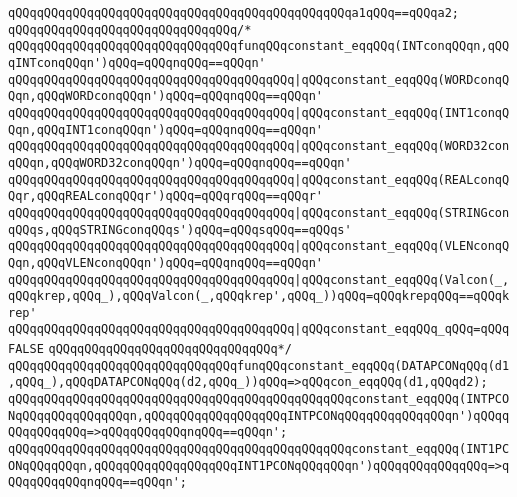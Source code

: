 \verb|qQQqqQQqqQQqqQQqqQQqqQQqqQQqqQQqqQQqqQQqqQQqqQQqa1qQQq==qQQqa2;|\newline
\newline
\verb|qQQqqQQqqQQqqQQqqQQqqQQqqQQqqQQq/*|\newline
\verb|qQQqqQQqqQQqqQQqqQQqqQQqqQQqqQQqfunqQQqconstant_eqqQQq(INTconqQQqn,qQQqINTconqQQqn')qQQq=qQQqnqQQq==qQQqn'|\newline
\verb|qQQqqQQqqQQqqQQqqQQqqQQqqQQqqQQqqQQqqQQq|\verb#|qQQqconstant_eqqQQq(WORDconqQQqn,qQQqWORDconqQQqn')qQQq=qQQqnqQQq==qQQqn'#\newline
\verb|qQQqqQQqqQQqqQQqqQQqqQQqqQQqqQQqqQQqqQQq|\verb#|qQQqconstant_eqqQQq(INT1conqQQqn,qQQqINT1conqQQqn')qQQq=qQQqnqQQq==qQQqn'#\newline
\verb|qQQqqQQqqQQqqQQqqQQqqQQqqQQqqQQqqQQqqQQq|\verb#|qQQqconstant_eqqQQq(WORD32conqQQqn,qQQqWORD32conqQQqn')qQQq=qQQqnqQQq==qQQqn'#\newline
\verb|qQQqqQQqqQQqqQQqqQQqqQQqqQQqqQQqqQQqqQQq|\verb#|qQQqconstant_eqqQQq(REALconqQQqr,qQQqREALconqQQqr')qQQq=qQQqrqQQq==qQQqr'#\newline
\verb|qQQqqQQqqQQqqQQqqQQqqQQqqQQqqQQqqQQqqQQq|\verb#|qQQqconstant_eqqQQq(STRINGconqQQqs,qQQqSTRINGconqQQqs')qQQq=qQQqsqQQq==qQQqs'#\newline
\verb|qQQqqQQqqQQqqQQqqQQqqQQqqQQqqQQqqQQqqQQq|\verb#|qQQqconstant_eqqQQq(VLENconqQQqn,qQQqVLENconqQQqn')qQQq=qQQqnqQQq==qQQqn'#\newline
\verb|qQQqqQQqqQQqqQQqqQQqqQQqqQQqqQQqqQQqqQQq|\verb#|qQQqconstant_eqqQQq(Valcon(_,qQQqkrep,qQQq_),qQQqValcon(_,qQQqkrep',qQQq_))qQQq=qQQqkrepqQQq==qQQqkrep'#\newline
\verb|qQQqqQQqqQQqqQQqqQQqqQQqqQQqqQQqqQQqqQQq|\verb#|qQQqconstant_eqqQQq_qQQq=qQQqFALSE#\newline
\verb|qQQqqQQqqQQqqQQqqQQqqQQqqQQqqQQq*/|\newline
\newline
\verb|qQQqqQQqqQQqqQQqqQQqqQQqqQQqqQQqfunqQQqconstant_eqqQQq(DATAPCONqQQq(d1,qQQq_),qQQqDATAPCONqQQq(d2,qQQq_))qQQq=>qQQqcon_eqqQQq(d1,qQQqd2);|\newline
\verb|qQQqqQQqqQQqqQQqqQQqqQQqqQQqqQQqqQQqqQQqqQQqqQQqconstant_eqqQQq(INTPCONqQQqqQQqqQQqqQQqn,qQQqqQQqqQQqqQQqqQQqINTPCONqQQqqQQqqQQqqQQqn')qQQqqQQqqQQqqQQq=>qQQqqQQqqQQqnqQQq==qQQqn';|\newline
\verb|qQQqqQQqqQQqqQQqqQQqqQQqqQQqqQQqqQQqqQQqqQQqqQQqconstant_eqqQQq(INT1PCONqQQqqQQqn,qQQqqQQqqQQqqQQqqQQqINT1PCONqQQqqQQqn')qQQqqQQqqQQqqQQq=>qQQqqQQqqQQqnqQQq==qQQqn';|\newline
